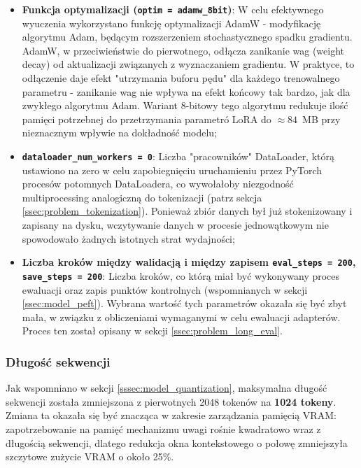 \documentclass[12pt,a4paper]{article}
\begin{document}
\begin{itemize}
    \item \textbf{Funkcja optymalizacji (\texttt{optim = adamw\_8bit})}: W celu efektywnego wyuczenia wykorzystano funkcję optymalizacji AdamW - 
            modyfikację algorytmu Adam, będącym rozszerzeniem stochastycznego spadku gradientu. AdamW, w przeciwieństwie do pierwotnego, odłącza zanikanie wag (weight decay)
            od aktualizacji związanych z wyznaczaniem gradientu. W praktyce, to odłączenie daje efekt "utrzymania buforu pędu" dla każdego trenowalnego parametru - 
            zanikanie wag nie wpływa na efekt końcowy tak bardzo, jak dla zwykłego algorytmu Adam. 
            Wariant 8-bitowy tego algorytmu redukuje ilość pamięci potrzebnej do przetrzymania parametró LoRA do  $\approx 84$~MB przy nieznacznym wpływie na dokładność modelu;

    \item \textbf{\texttt{dataloader\_num\_workers = 0}}: Liczba "pracowników" DataLoader, którą ustawiono na zero w celu zapobiegnięciu uruchamieniu przez PyTorch
            procesów potomnych DataLoadera, co wywołałoby niezgodność multiprocessing analogiczną do tokenizacji (patrz sekcja \ref{ssec:problem_tokenization}).
            Ponieważ zbiór danych był już stokenizowany i zapisany na dysku, wczytywanie danych w procesie jednowątkowym nie spowodowało żadnych istotnych strat wydajności;

    \item \textbf{Liczba kroków między walidacją i między zapisem \texttt{eval\_steps = 200}, \texttt{save\_steps = 200}}: 
            Liczba kroków, co którą miał być wykonywany proces ewaluacji oraz zapis punktów kontrolnych (wspomnianych w sekcji \ref{ssec:model_peft}). Wybrana wartość tych 
            parametrów okazała się być zbyt mała, w związku z obliczeniami wymaganymi w celu ewaluacji adapterów. Proces ten został opisany w sekcji \ref{ssec:problem_long_eval}.

\end{itemize}




\subsubsection{Długość sekwencji}

Jak wspomniano w sekcji \ref{sssec:model_quantization}, maksymalna długość sekwencji została zmniejszona z pierwotnych 2048 tokenów na \textbf{1024 tokeny}.
Zmiana ta okazała się być znacząca w zakresie zarządzania pamięcią VRAM: zapotrzebowanie na pamięć mechanizmu uwagi rośnie kwadratowo wraz z długością sekwencji,
dlatego redukcja okna kontekstowego o połowę zmniejszyła szczytowe zużycie VRAM o około 25\%. 
\end{document}
